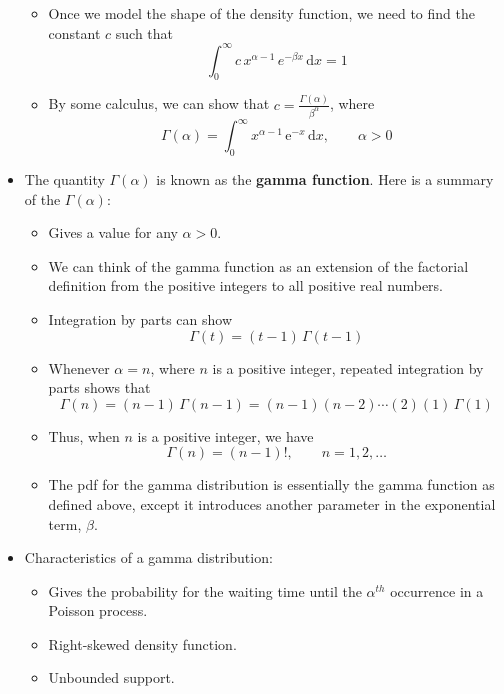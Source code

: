 \documentclass{article}
\newcommand{\integral}[4]{\displaystyle \int_{#1}^{#2} #3 \,\mathrm{d} #4}		%
\newcommand{\e}{\mathrm{e}}		%
\newcommand{\gam}[1]{\Gamma(#1)}		%
\begin{document}
\begin{itemize}
\begin{itemize}
        \item Once we model the shape of the density function, we need to find the constant $c$ such that
        \[\integral{0}{\infty}{c \, x^{\alpha - 1} \, e^{-\beta x}}{x} = 1\]
        \item[] By some calculus, we can show that $c = \frac{\gam{\alpha}}{\beta^\alpha}$, where \[\gam{\alpha} = \integral{0}{\infty}{x^{\alpha - 1}\, \e^{-x}}{x}, \quad\quad \alpha > 0\]
    \end{itemize}
    \item The quantity $\gam{\alpha}$ is known as the \textbf{gamma function}. Here is a summary of the $\gam{\alpha}$:
    \begin{itemize}
        \item Gives a value for any $\alpha > 0$. 
        \item We can think of the gamma function as an extension of the factorial definition from the positive integers to all positive real numbers.
        \item[] Integration by parts can show
        \[\gam{t} = (t - 1) \, \gam{t - 1}\]
        \item Whenever $\alpha = n$, where $n$ is a positive integer, repeated integration by parts shows that
        \[\gam{n} = (n - 1) \, \gam{n - 1} = (n - 1) (n - 2) \cdots (2) (1) \, \gam{1}\]
        \vspace{30pt}
        \item[] Thus, when $n$ is a positive integer, we have
        \[\gam{n} = (n - 1)!, \quad\quad n = 1, 2, \ldots\]
        \item The pdf for the gamma distribution is essentially the gamma function as defined above, except it introduces another parameter in the exponential term, $\beta$.\bigskip
    \end{itemize}
    \item Characteristics of a gamma distribution:
    \begin{itemize}
        \item Gives the probability for the waiting time until the $\alpha^{th}$ occurrence in a  Poisson process.
        \item Right-skewed density function.
        \item Unbounded support.
        
        \newpage
        

\end{itemize}
\end{itemize}
\end{document}

